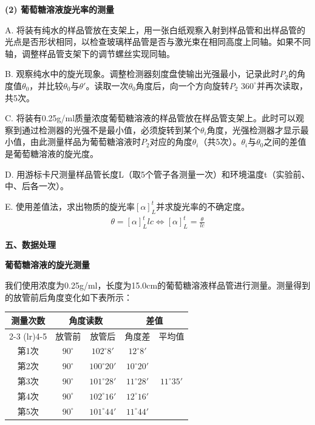 ﻿\documentclass[12pt,a4paper]{article}
\begin{document}
\textbf{(2) 葡萄糖溶液旋光率的测量}

A. 将装有纯水的样品管放在支架上，用一张白纸观察入射到样品管和出样品管的光点是否形状相同，以检查玻璃样品管是否与激光束在相同高度上同轴。如果不同轴，调整样品管支架下的调节螺丝实现同轴。

B. 观察纯水中的旋光现象。调整检测器刻度盘使输出光强最小，记录此时$P_{2}$的角度值$\theta _{0}$，并比较$\theta _{0}$与${\theta}'$。读取一次$\theta _{0}$角度后，向一个方向旋转$P_{2}$ $360^\circ$并再次读取，共5次。

C. 将装有0.25g/ml质量浓度葡萄糖溶液的样品管放在样品管支架上。此时可以观察到通过检测器的光强不是最小值，必须旋转到某个$\theta _{i}$角度，光强检测器才显示最小值，由此测量样品为葡萄糖溶液时$P_{2}$对应的角度$\theta _{i}$（共5次）。$\theta _{i}$与$\theta _{0}$之间的差值是葡萄糖溶液的旋光度。

D. 用游标卡尺测量样品管长度L（取5个管子各测量一次）和环境温度t（实验前、中、后各一次）。

E. 使用差值法，求出物质的旋光率$\left [ \alpha  \right ] _{L}^{t}$并求旋光率的不确定度。
\begin{eqnarray} 
\theta = \left [ \alpha  \right ] _{L}^{t} lc \Longleftrightarrow \left [ \alpha  \right ] _{L}^{t}=\frac{\theta}{lc} 
\end{eqnarray}

\vspace{0.5cm}
\textbf{五、数据处理}

\textbf{葡萄糖溶液的旋光测量}

我们使用浓度为0.25g/ml，长度为15.0cm的葡萄糖溶液样品管进行测量。测量得到的放管前后角度变化如下表所示：

\begin{center}
    \begin{tabular}{ccccc}
        \toprule
        测量次数 & \multicolumn{2}{c}{角度读数} & \multicolumn{2}{c}{差值} \\
        \cmidrule(lr){2-3} \cmidrule(lr){4-5}
        & 放管前 & 放管后 & 角度差 & 平均值 \\
        \midrule
        第1次 & $90^\circ$ & $102^\circ8'$ & $12^\circ8'$ & \multirow{5}{*}{$11^\circ35'$} \\
        第2次 & $90^\circ$ & $100^\circ20'$ & $10^\circ20'$ & \\
        第3次 & $90^\circ$ & $101^\circ28'$ & $11^\circ28'$ & \\
        第4次 & $90^\circ$ & $102^\circ16'$ & $12^\circ16'$ & \\
        第5次 & $90^\circ$ & $101^\circ44'$ & $11^\circ44'$ & \\
        \bottomrule
    \end{tabular}
\end{center}
\end{document}
